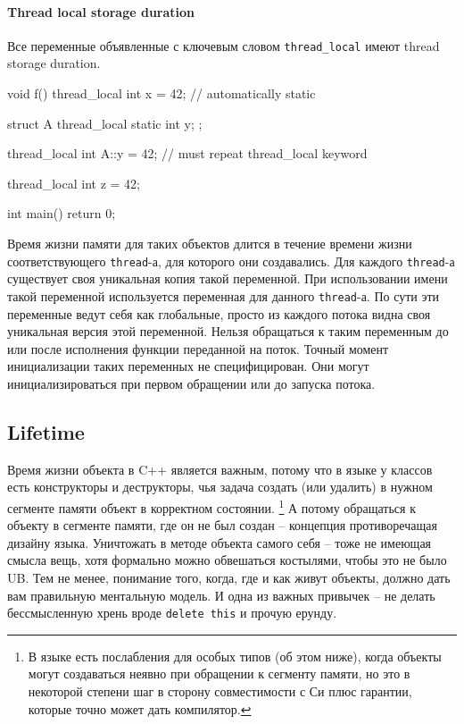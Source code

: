 \documentclass{article}
\begin{document}
\paragraph{Thread local storage duration}

Все переменные объявленные с ключевым словом \verb"thread_local" имеют thread storage duration.
\begin{cppcode}
void f() {
  thread_local int x = 42; // automatically static
}

struct A {
  thread_local static int y;
};

thread_local int A::y = 42; // must repeat thread_local keyword

thread_local int z = 42;

int main() {
  return 0;
}
\end{cppcode}
Время жизни памяти для таких объектов длится в течение времени жизни соответствующего \verb"thread"-а, для которого они создавались.
Для каждого \verb"thread"-а существует своя уникальная копия такой переменной.
При использовании имени такой переменной используется переменная для данного \verb"thread"-а.
По сути эти переменные ведут себя как глобальные, просто из каждого потока видна своя уникальная версия этой переменной.
Нельзя обращаться к таким переменным до или после исполнения функции переданной на поток.
Точный момент инициализации таких переменных не специфицирован.
Они могут инициализироваться при первом обращении или до запуска потока.

\subsection{Lifetime}
\label{section::Lifetime}

Время жизни объекта в C++ является важным, потому что в языке у классов есть конструкторы и деструкторы, чья задача создать (или удалить) в нужном сегменте памяти объект в корректном состоянии.%
\footnote{В языке есть послабления для особых типов (об этом ниже), когда объекты могут создаваться неявно при обращении к сегменту памяти, но это в некоторой степени шаг в сторону совместимости с Си плюс гарантии, которые точно может дать компилятор.}
А потому обращаться к объекту в сегменте памяти, где он не был создан -- концепция противоречащая дизайну языка.
Уничтожать в методе объекта самого себя -- тоже не имеющая смысла вещь, хотя формально можно обвешаться костылями, чтобы это не было UB.
Тем не менее, понимание того, когда, где и как живут объекты, должно дать вам правильную ментальную модель.
И одна из важных привычек -- не делать бессмысленную хрень вроде \verb"delete this" и прочую ерунду.
\end{document}
